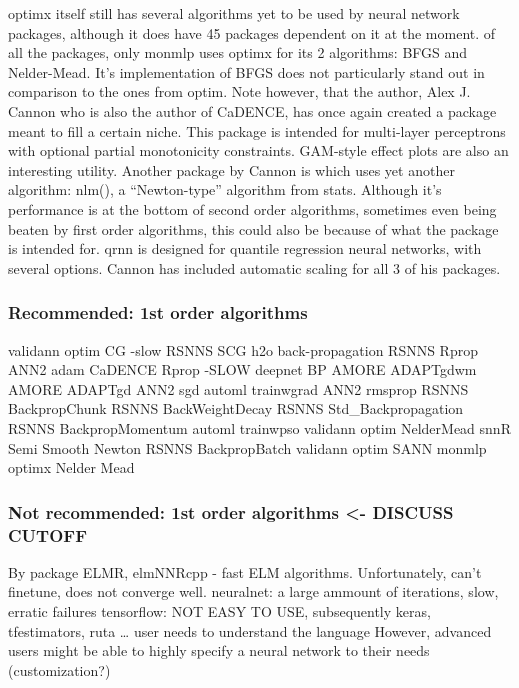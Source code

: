 optimx itself still has several algorithms yet to be used by neural
network packages, although it does have 45 packages dependent on it at
the moment.  \citep{R-monmlp} of all the packages, only
monmlp uses optimx for its 2 algorithms: BFGS and Nelder-Mead. It's
implementation of BFGS does not particularly stand out in comparison to
the ones from optim. Note however, that the author, Alex J. Cannon who
is also the author of CaDENCE, has once again created a package meant to
fill a certain niche. This package is intended for multi-layer
perceptrons with optional partial monotonicity constraints. GAM-style
effect plots are also an interesting utility. Another package by Cannon
is  \citep{R-qrnn} which uses yet another algorithm:
nlm(), a ``Newton-type'' algorithm from stats. Although it's performance
is at the bottom of second order algorithms, sometimes even being beaten
by first order algorithms, this could also be because of what the
package is intended for. qrnn is designed for quantile regression neural
networks, with several options. Cannon has included automatic scaling
for all 3 of his packages.

\hypertarget{recommended-1st-order-algorithms}{%
\subsubsection{Recommended: 1st order
algorithms}\label{recommended-1st-order-algorithms}}

validann optim CG -slow RSNNS SCG h2o back-propagation RSNNS Rprop ANN2
adam CaDENCE Rprop -SLOW deepnet BP AMORE ADAPTgdwm AMORE ADAPTgd ANN2
sgd automl trainwgrad ANN2 rmsprop RSNNS BackpropChunk RSNNS
BackWeightDecay RSNNS Std\_Backpropagation RSNNS BackpropMomentum automl
trainwpso validann optim NelderMead snnR Semi Smooth Newton RSNNS
BackpropBatch validann optim SANN monmlp optimx Nelder Mead

\hypertarget{not-recommended-1st-order-algorithms---discuss-cutoff}{%
\subsubsection{Not recommended: 1st order algorithms \textless- DISCUSS
CUTOFF}\label{not-recommended-1st-order-algorithms---discuss-cutoff}}

By package ELMR, elmNNRcpp - fast ELM algorithms. Unfortunately, can't
finetune, does not converge well. neuralnet: a large ammount of
iterations, slow, erratic failures tensorflow: NOT EASY TO USE,
subsequently keras, tfestimators, ruta \ldots{} user needs to understand
the language However, advanced users might be able to highly specify a
neural network to their needs (customization?)

